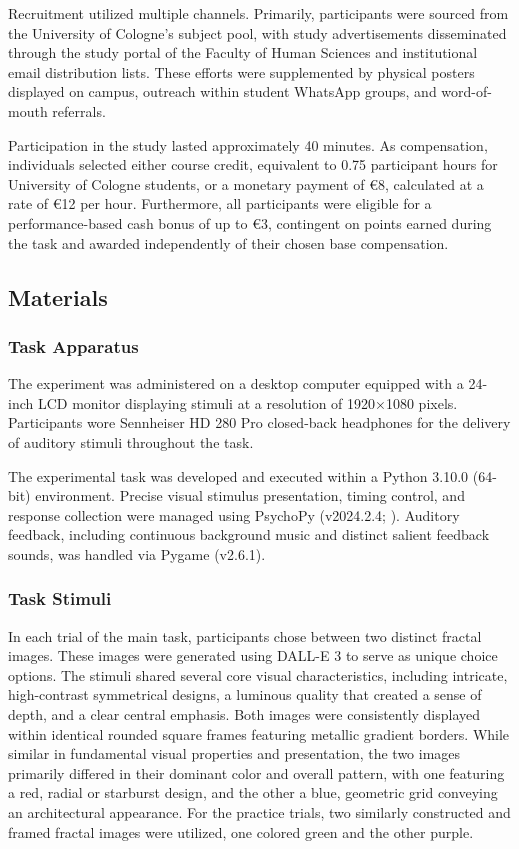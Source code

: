 Recruitment utilized multiple channels. Primarily, participants were sourced from the University of Cologne's subject pool, with study advertisements disseminated through the study portal of the Faculty of Human Sciences and institutional email distribution lists. These efforts were supplemented by physical posters displayed on campus, outreach within student WhatsApp groups, and word-of-mouth referrals.

Participation in the study lasted approximately 40 minutes. As compensation, individuals selected either course credit, equivalent to 0.75 participant hours for University of Cologne students, or a monetary payment of €8, calculated at a rate of €12 per hour. Furthermore, all participants were eligible for a performance-based cash bonus of up to €3, contingent on points earned during the task and awarded independently of their chosen base compensation.

\subsection{Materials}

\subsubsection{Task Apparatus}

The experiment was administered on a desktop computer equipped with a 24-inch LCD monitor displaying stimuli at a resolution of 1920×1080 pixels. Participants wore Sennheiser HD 280 Pro closed-back headphones for the delivery of auditory stimuli throughout the task.

The experimental task was developed and executed within a Python 3.10.0 (64-bit) environment. Precise visual stimulus presentation, timing control, and response collection were managed using PsychoPy (v2024.2.4; \citealt{peirce2019}). Auditory feedback, including continuous background music and distinct salient feedback sounds, was handled via Pygame (v2.6.1).

\subsubsection{Task Stimuli}

In each trial of the main task, participants chose between two distinct fractal images. These images were generated using DALL-E 3 \citep{openai2024} to serve as unique choice options. The stimuli shared several core visual characteristics, including intricate, high-contrast symmetrical designs, a luminous quality that created a sense of depth, and a clear central emphasis. Both images were consistently displayed within identical rounded square frames featuring metallic gradient borders. While similar in fundamental visual properties and presentation, the two images primarily differed in their dominant color and overall pattern, with one featuring a red, radial or starburst design, and the other a blue, geometric grid conveying an architectural appearance. For the practice trials, two similarly constructed and framed fractal images were utilized, one colored green and the other purple.

